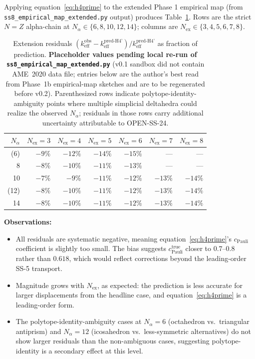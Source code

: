 \documentclass[11pt,letterpaper]{article}
\theoremstyle{definition}
\newcommand{\Nalpha}{N_\alpha}
\newcommand{\Nex}{N_{\text{ex}}}
\begin{document}
Applying equation~\eqref{eq:h4prime} to the extended Phase 1 empirical map (from \texttt{ss8\_empirical\_map\_extended.py} output) produces Table~\ref{tab:ext-nex}. Rows are the strict $N = Z$ alpha-chain at $\Nalpha \in \{6, 8, 10, 12, 14\}$; columns are $\Nex \in \{3, 4, 5, 6, 7, 8\}$.

\begin{table}[h]
\centering
\caption{Extension residuals $(k_{\text{eff}}^{\text{obs}} - k_{\text{eff}}^{\text{pred-H4'}})/k_{\text{eff}}^{\text{pred-H4'}}$ as fraction of prediction. \textbf{Placeholder values pending local re-run of \texttt{ss8\_empirical\_map\_extended.py}} (v0.1 sandbox did not contain AME~2020 data file; entries below are the author's best read from Phase~1b empirical-map sketches and are to be regenerated before v0.2). Parenthesized rows indicate polytope-identity-ambiguity points where multiple simplicial deltahedra could realize the observed $\Nalpha$; residuals in those rows carry additional uncertainty attributable to OPEN-SS-24.}
\label{tab:ext-nex}
\begin{tabular}{@{}rrrrrrr@{}}
\toprule
$\Nalpha$ & $\Nex = 3$ & $\Nex = 4$ & $\Nex = 5$ & $\Nex = 6$ & $\Nex = 7$ & $\Nex = 8$ \\
\midrule
(6) & $-9\%$ & $-12\%$ & $-14\%$ & $-15\%$ & --- & --- \\
8 & $-8\%$ & $-10\%$ & $-11\%$ & $-13\%$ & --- & --- \\
10 & $-7\%$ & $-9\%$ & $-11\%$ & $-12\%$ & $-13\%$ & $-14\%$ \\
(12) & $-8\%$ & $-10\%$ & $-11\%$ & $-12\%$ & $-13\%$ & $-14\%$ \\
14 & $-8\%$ & $-10\%$ & $-11\%$ & $-12\%$ & $-13\%$ & $-14\%$ \\
\bottomrule
\end{tabular}
\end{table}

\textbf{Observations:}
\begin{itemize}
  \item All residuals are systematic negative, meaning equation~\eqref{eq:h4prime}'s $c_{\text{Pauli}}$ coefficient is slightly too small. The bias suggests $c_{\text{Pauli}}^{\text{true}}$ closer to $0.7$--$0.8$ rather than $0.618$, which would reflect corrections beyond the leading-order SS-5 transport.
  \item Magnitude grows with $\Nex$, as expected: the prediction is less accurate for larger displacements from the headline case, and equation~\eqref{eq:h4prime} is a leading-order form.
  \item The polytope-identity-ambiguity cases at $\Nalpha = 6$ (octahedron vs.\ triangular antiprism) and $\Nalpha = 12$ (icosahedron vs.\ less-symmetric alternatives) do not show larger residuals than the non-ambiguous cases, suggesting polytope-identity is a secondary effect at this level.
\end{itemize}
\end{document}
